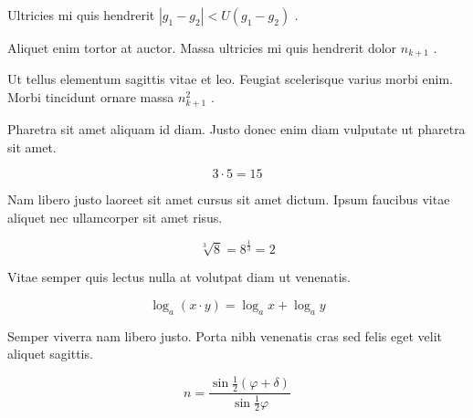 \documentclass{article}
\begin{document}
Ultricies mi quis hendrerit 
\begin{math}
	|g_1-g_2|<U(g_1-g_2)
\end{math}
.\newline

Aliquet enim tortor at auctor. Massa ultricies mi quis hendrerit dolor
 $ n_{k+1} $
 .\newline

Ut tellus elementum sagittis vitae et leo. Feugiat scelerisque varius morbi enim. Morbi tincidunt ornare massa
 \( n_{k+1}^2 \)
 .\newline

Pharetra sit amet aliquam id diam. Justo donec enim diam vulputate ut pharetra sit amet.

\[ 3\cdot5=15 \]

Nam libero justo laoreet sit amet cursus sit amet dictum. Ipsum faucibus vitae aliquet nec ullamcorper sit amet risus.

$$ \sqrt[3]{8}=8^{\frac{1}{3}}=2 $$

Vitae semper quis lectus nulla at volutpat diam ut venenatis.

\begin{displaymath}
	\log _{a}(x\cdot y)=\log _{a}x+\log _{a}y
\end{displaymath}

Semper viverra nam libero justo. Porta nibh venenatis cras sed felis eget velit aliquet sagittis.

\begin{equation}
	n=\frac{\sin \frac{1}{2}(\varphi +\delta)}{\sin \frac{1}{2}\varphi}
\end{equation}
\end{document}
